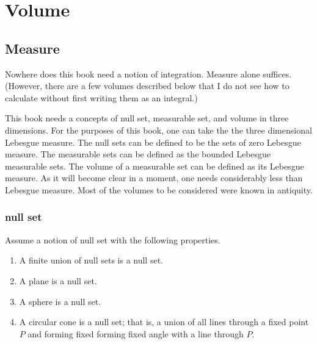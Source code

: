 
\chapter{Volume}

\section{Measure}

Nowhere does this book need a notion
of integration.  Measure alone suffices.  (However, there are a few
volumes described below that I do not see how to calculate without
first writing them as an integral.)

This book needs a concepts of null set, measurable set, and volume in
three dimensions.  For the purposes of this book, one can take the
the three dimensional Lebesgue measure.   
The null sets can be defined
to be the sets of zero Lebesgue measure. The measurable sets can
be defined as the bounded Lebesgue measurable sets.  The volume of
a measurable set can be defined as its Lebesgue measure.
As it will become clear in a moment, one needs considerably less than Lebesgue measure.
Most of the volumes to be considered were known in antiquity.


\subsection{null set}\label{sec:null}

Assume a notion of null set with the following
properties.

\begin{enumerate}%
\item A finite union of null sets is a null set.\\
 \item A plane is a null set.\\
 \item A sphere is a null set.\\
 \item A circular cone is a null set; that is, a union of all
  lines through a fixed point $P$ and forming fixed
 forming fixed angle with a line through $P$.
\end{enumerate}

